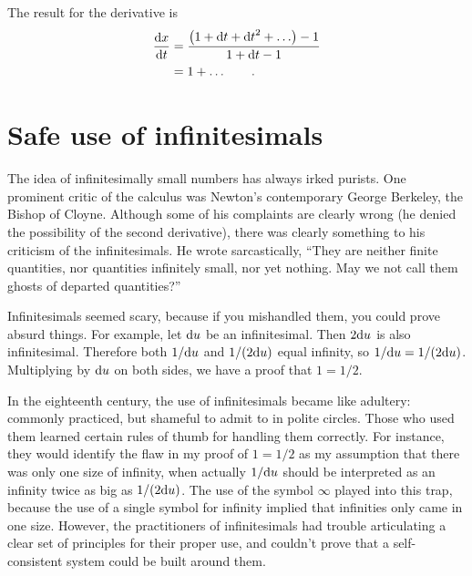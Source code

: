 \begin{eg}
The result for the derivative is
\begin{align*}
  \frac{\textup{d} x}{\textup{d} t} &= \frac{\left(1+\textup{d} t+{\textup{d} t}^2+\ldots\right)-1}{1+\textup{d} t-1} \\
                        &= 1+\ldots \qquad .
\end{align*}
\end{eg}

%

\section{Safe use of infinitesimals}\label{sec:safe-infinitesimals}

The idea of infinitesimally small numbers has always irked purists. One prominent critic of the calculus was Newton's
contemporary George Berkeley, the Bishop of Cloyne. Although some of his complaints are clearly wrong (he denied the
possibility of the second derivative), there was clearly something to his criticism of the infinitesimals. He wrote
sarcastically,
``They are neither finite quantities, nor quantities infinitely small, nor yet nothing. May we not call them ghosts of departed quantities?''

%
%
Infinitesimals seemed scary, because if you mishandled them, you could prove absurd things. For example, let $\textup{d} u$ be
an infinitesimal. Then $2\textup{d} u$ is also infinitesimal. Therefore both $1/\textup{d} u$ and $1/(2\textup{d} u)$ equal infinity, so
$1/\textup{d} u = 1/(2\textup{d} u)$. Multiplying by $\textup{d} u$ on both sides, we have a proof that $1=1/2$.\label{bogus-proof}

In the eighteenth century, the use of infinitesimals became like adultery: commonly practiced, but shameful to admit
to in polite circles. Those who used them learned certain rules of thumb for handling them correctly. For instance,
they would identify the flaw in my proof of $1=1/2$ as my assumption that there was only one size of infinity,
when actually $1/\textup{d} u$ should be interpreted as an infinity twice as big as $1/(2\textup{d} u)$. The use of the symbol
$\infty$ played into this trap, because the use of a single symbol for infinity implied that infinities only came
in one size. However, the practitioners of infinitesimals had trouble articulating a clear set of principles
for their proper use, and couldn't prove that a self-consistent system could be built around them.

